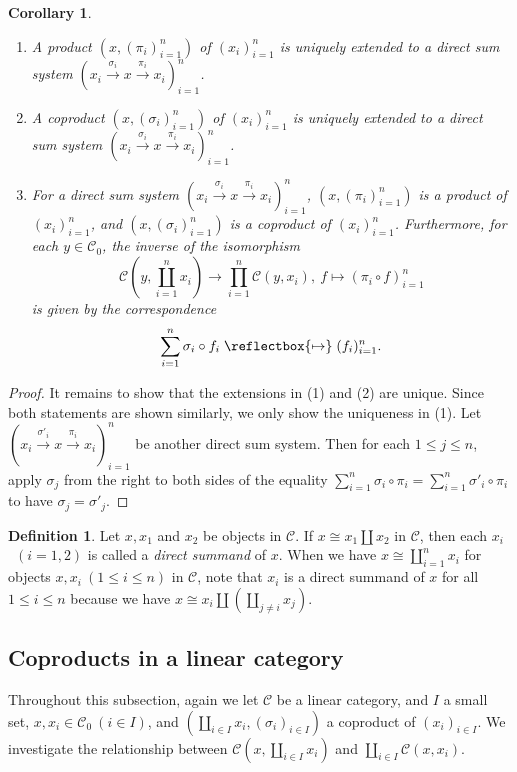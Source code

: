 \documentclass{surv-l}
\numberwithin{equation}{chapter}
\numberwithin{figure}{chapter}
\theoremstyle{plain}
\newtheorem{cor}[thm]{Corollary}
\theoremstyle{definition}
\newtheorem{dfn}[thm]{Definition}
\theoremstyle{remark}
\newcommand{\mapsfrom}{\mathrel{\reflectbox{\ensuremath{\mapsto}}}}
\begin{document}
\begin{cor}\leavevmode
\label{cor:finite-coprod}
\begin{enumerate}
\item
A product $(x, (\pi_i)_{i=1}^n)$ of $(x_i)_{i=1}^n$ is uniquely extended to
a direct sum system $(x_i \xrightarrow{\sigma_i} x \xrightarrow{\pi_i} x_i)_{i=1}^n$.
\item
A coproduct $(x, (\sigma_i)_{i=1}^n)$ of $(x_i)_{i=1}^n$ is uniquely extended to
a direct sum system $(x_i \xrightarrow{\sigma_i} x \xrightarrow{\pi_i} x_i)_{i=1}^n$.
\item
For a direct sum system $(x_i \xrightarrow{\sigma_i} x \xrightarrow{\pi_i} x_i)_{i=1}^n$,
$(x, (\pi_i)_{i=1}^n)$ is a product of $(x_i)_{i=1}^n$, and
$(x, (\sigma_i)_{i=1}^n)$ is a coproduct of $(x_i)_{i=1}^n$.
Furthermore, for each $y \in {\mathcal{C}}_0$, the inverse of the isomorphism
\[
{\mathcal{C}}(y, \coprod_{i=1}^n x_i) \to \prod_{i=1}^n{\mathcal{C}}(y, x_i), \ f \mapsto (\pi_i\circ f)_{i=1}^n
\]
is given by the correspondence
\[
\sum_{i=1}^n \sigma_i \circ f_i \mapsfrom (f_i)_{i=1}^n.
\]
\end{enumerate}
\end{cor}

\begin{proof}
It remains to show that the extensions in (1) and (2) are unique.
Since both statements are shown similarly, we only show the uniqueness in (1).
Let $(x_i \xrightarrow{\sigma'_i} x \xrightarrow{\pi_i} x_i)_{i=1}^n$ be another direct sum system.
Then for each $1 \le j \le n$, apply $\sigma_j$ from the right to both sides of
the equality
$\sum_{i=1}^n \sigma_i\circ \pi_i = \sum_{i=1}^n \sigma'_i\circ \pi_i$
to have $\sigma_j = \sigma'_j$.
\end{proof}

\begin{dfn}\label{dfn:dir-summand}
Let $x, x_1$ and  $x_2$ be objects in ${\mathcal{C}}$.
If $x \cong x_1 \amalg x_2$ in ${\mathcal{C}}$, then
each $x_i$ \ $(i = 1, 2)$ is called a \emph{direct summand} of $x$.
When we have $x \cong \coprod_{i=1}^n x_i$ for objects $x, x_i\ (1 \le i \le n)$
in ${\mathcal{C}}$, note that $x_i$ is a direct summand of $x$ for all $1 \le i \le n$
because we have $x \cong x_i \amalg \left(\coprod_{j \ne i} x_j\right)$.
\end{dfn}

\subsection{Coproducts in a linear category}
Throughout this subsection, again we let ${\mathcal{C}}$ be a linear category,
and $I$ a small set, $x, x_i \!\in\! {\mathcal{C}}_0\ (i \!\in\! I)$, and
{\small$(\coprod_{i\in I}x_i, (\sigma_i)_{i\in I})$} a coproduct of $(x_i)_{i \in I}$.
We investigate the relationship between
${\mathcal{C}}(x, \coprod_{i\in I} x_i)$ and $\coprod_{i\in I}{\mathcal{C}}(x, x_i)$.
\end{document}
